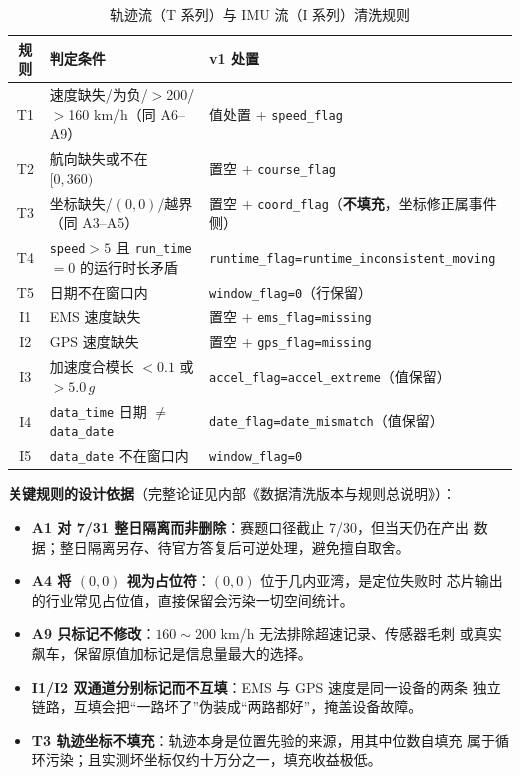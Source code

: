 \begin{table}[H]
\centering
\caption{轨迹流（T 系列）与 IMU 流（I 系列）清洗规则}
\label{tab:rule-ti}
\small
\begin{tabularx}{\textwidth}{cLL}
\toprule
规则 & 判定条件 & v1 处置 \\
\midrule
T1 & 速度缺失/为负/$>$200/$>$160 km/h（同 A6--A9） & 值处置 + \texttt{speed\_flag} \\
T2 & 航向缺失或不在 $[0,360)$ & 置空 + \texttt{course\_flag} \\
T3 & 坐标缺失/$(0,0)$/越界（同 A3--A5） & 置空 + \texttt{coord\_flag}（\textbf{不填充}，坐标修正属事件侧） \\
T4 & \texttt{speed}$>5$ 且 \texttt{run\_time}$=0$ 的运行时长矛盾 & \texttt{runtime\_flag=\allowbreak runtime\_inconsistent\_moving} \\
T5 & 日期不在窗口内 & \texttt{window\_flag=0}（行保留） \\
\midrule
I1 & EMS 速度缺失 & 置空 + \texttt{ems\_flag=missing} \\
I2 & GPS 速度缺失 & 置空 + \texttt{gps\_flag=missing} \\
I3 & 加速度合模长 $<0.1$ 或 $>5.0\,g$ & \texttt{accel\_flag=accel\_extreme}（值保留） \\
I4 & \texttt{data\_time} 日期 $\neq$ \texttt{data\_date} & \texttt{date\_flag=date\_mismatch}（值保留） \\
I5 & \texttt{data\_date} 不在窗口内 & \texttt{window\_flag=0} \\
\bottomrule
\end{tabularx}
\end{table}

\noindent\textbf{关键规则的设计依据}（完整论证见内部《数据清洗版本与规则总说明》）：
\begin{itemize}
  \item \textbf{A1 对 7/31 整日隔离而非删除}：赛题口径截止 7/30，但当天仍在产出
        数据；整日隔离另存、待官方答复后可逆处理，避免擅自取舍。
  \item \textbf{A4 将 $(0,0)$ 视为占位符}：$(0,0)$ 位于几内亚湾，是定位失败时
        芯片输出的行业常见占位值，直接保留会污染一切空间统计。
  \item \textbf{A9 只标记不修改}：$160\sim200$ km/h 无法排除超速记录、传感器毛刺
        或真实飙车，保留原值加标记是信息量最大的选择。
  \item \textbf{I1/I2 双通道分别标记而不互填}：EMS 与 GPS 速度是同一设备的两条
        独立链路，互填会把“一路坏了”伪装成“两路都好”，掩盖设备故障。
  \item \textbf{T3 轨迹坐标不填充}：轨迹本身是位置先验的来源，用其中位数自填充
        属于循环污染；且实测坏坐标仅约十万分之一，填充收益极低。
\end{itemize}

